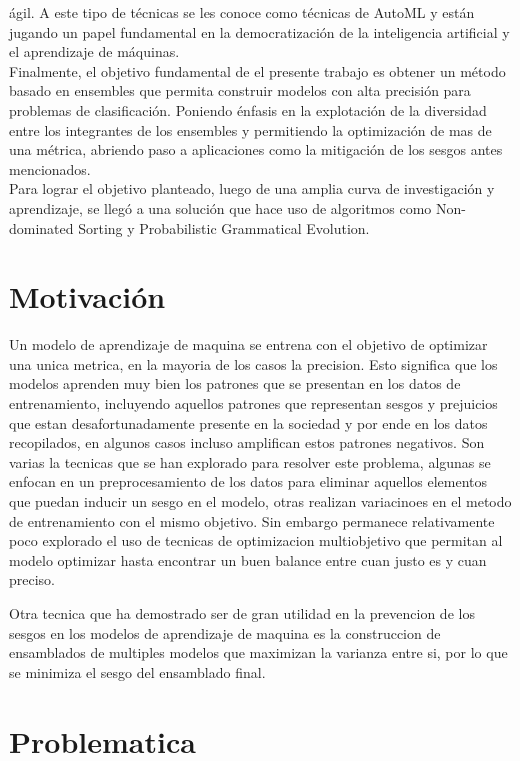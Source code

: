\documentclass[runningheads,a4paper]{llncs}
\begin{document}
	ágil. A este tipo de técnicas se les conoce como técnicas de AutoML y están jugando un
	papel fundamental en la democratización de la inteligencia artificial y el aprendizaje de
	máquinas.\\
	Finalmente, el objetivo fundamental de el presente trabajo es
	obtener un método basado en ensembles que permita construir modelos con alta precisión
	para problemas de clasificación. Poniendo énfasis en la explotación de la diversidad entre los
	integrantes de los ensembles y permitiendo la optimización de mas de una métrica, abriendo
	paso a aplicaciones como la mitigación de los sesgos antes mencionados.\\
	Para lograr el objetivo planteado, luego de una amplia curva de investigación y aprendizaje, se llegó a una solución que hace uso de algoritmos como Non-dominated Sorting y Probabilistic Grammatical Evolution.
	
	\section*{Motivación}
	
	Un modelo de aprendizaje de maquina se entrena con el objetivo de optimizar una unica metrica, en la mayoria de los casos la precision. Esto significa que los modelos aprenden muy bien los patrones que se presentan en los datos de entrenamiento, incluyendo aquellos patrones que representan sesgos y prejuicios que estan desafortunadamente presente en la sociedad y por ende en los datos recopilados, en algunos casos incluso amplifican estos patrones negativos. Son varias la tecnicas que se han explorado para resolver este problema, algunas se enfocan en un preprocesamiento de los datos para eliminar aquellos elementos que puedan inducir un sesgo en el modelo, otras realizan variacinoes en el metodo de entrenamiento con el mismo objetivo. Sin embargo permanece relativamente poco explorado el uso de tecnicas de optimizacion multiobjetivo que permitan al modelo optimizar hasta encontrar un buen balance entre cuan justo es y cuan preciso.
	
	Otra tecnica que ha demostrado ser de gran utilidad en la prevencion de los sesgos en los modelos de aprendizaje de maquina es la construccion de ensamblados de multiples modelos que maximizan la varianza entre si, por lo que se minimiza el sesgo del ensamblado final.
	
	\section*{Problematica}
	
\end{document}
